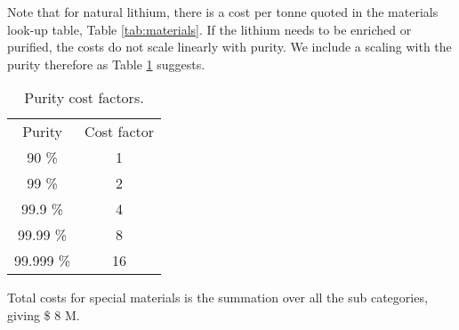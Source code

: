 Note that for natural lithium, there is a cost per tonne quoted in the materials look-up table, Table \ref{tab:materials}.  If the lithium needs to be enriched or purified, the costs do not scale linearly with purity.  We include a scaling with the purity therefore as Table \ref{tab:purity} suggests.

\begin{table}[]
    \centering
    \begin{tabular}{c|c}
       Purity  &  Cost factor \\
       90 \%  &  1 \\
       99 \%  &  2 \\
       99.9 \%  &  4 \\
       99.99 \%  &  8 \\
       99.999 \%  &  16 \\
    \end{tabular}
    \caption{Purity cost factors.}
    \label{tab:purity}
\end{table}

Total costs for special materials is the summation over all the sub categories, giving \$ 8 M.  



